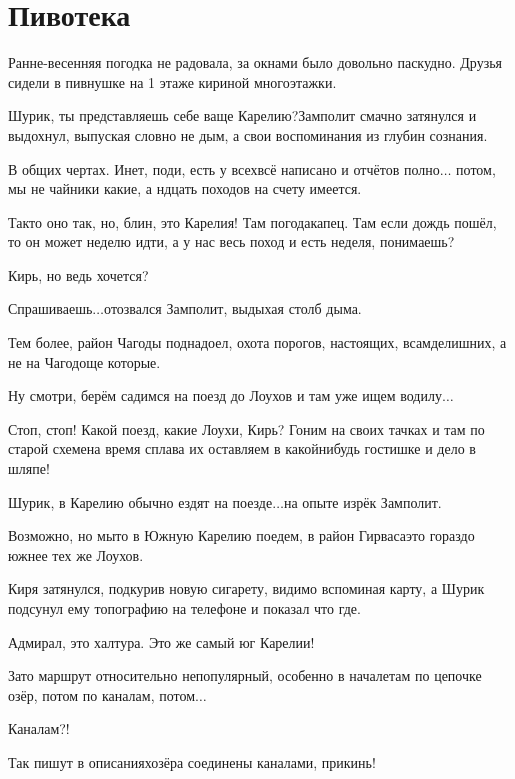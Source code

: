\chapter{Пивотека}
\vepsianrose

Ранне-весенняя погодка не радовала, за окнами было довольно паскудно. Друзья сидели в пивнушке на 1 этаже кириной многоэтажки.

\diagdash Шурик, ты представляешь себе ваще Карелию?\mdash Замполит смачно затянулся и выдохнул, выпуская словно не дым, а свои воспоминания из глубин сознания.

\diagdash В общих чертах. Инет, поди, есть у всех\mdash всё написано и отчётов полно$\ldots$ потом, мы не чайники какие, а н\sdash дцать походов на счету имеется.

\diagdash Так\sdash то оно так, но, блин, это Карелия! Там погода\mdash капец. Там если дождь пошёл, то он может неделю идти, а у нас весь поход и есть неделя, понимаешь?

\diagdash Кирь, но ведь хочется?

\diagdash Спрашиваешь$\ldots$\mdash отозвался Замполит, выдыхая столб дыма.

\diagdash Тем более, район Чагоды поднадоел, охота порогов, настоящих, всамделишних, а не на Чагодоще которые.

\diagdash Ну смотри, берём садимся на поезд до Лоухов и там уже ищем водилу$\ldots$

\diagdash Стоп, стоп! Какой поезд, какие Лоухи, Кирь? Гоним на своих тачках и там по старой схеме\mdash на время сплава их оставляем в какой\sdash нибудь гостишке и дело в шляпе!

\diagdash Шурик, в Карелию обычно ездят на поезде$\ldots$\mdash на опыте изрёк Замполит.

\diagdash Возможно, но мы\sdash то в Южную Карелию поедем, в район Гирваса\mdash это гораздо южнее тех же Лоухов.

Киря затянулся, подкурив новую сигарету, видимо вспоминая карту, а Шурик подсунул ему топографию на телефоне и показал что где.

\diagdash Адмирал, это халтура. Это же самый юг Карелии!

\diagdash Зато маршрут относительно непопулярный, особенно в начале\mdash там по цепочке озёр, потом по каналам, потом$\ldots$

\diagdash Каналам?!

\diagdash Так пишут в описаниях\mdash озёра соединены каналами, прикинь!

